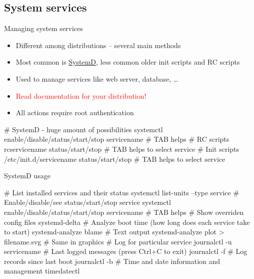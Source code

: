 \documentclass[compress, ucs, xelatex, 11pt, xcolor=svgnames,
  hyperref={
    bookmarks=true,
    unicode=true,
    colorlinks=true,
    pdftitle={Linux, command line and MetaCentrum},
    plainpages=false,
    pdfauthor={Vojtech Zeisek},
    pdfsubject={Course about use of Linux command line, writing shell scripts and using MetaCentrum of CESNET},
    pdfcreator={XeLaTeX},
    pdfkeywords={Linux, GNU, BASH, shell, command line, MetaCentrum},
    linkcolor=Red,
    anchorcolor=Blue,
    citecolor=Purple,
    filecolor=DodgerBlue,
    menucolor=DarkOrchid,
    urlcolor=DeepSkyBlue,
    pdftex},
  url={hyphens, lowtilde} %
  ]{beamer}
\renewcommand{\alert}[1]{\textcolor{red}{#1}}
\begin{document}

\subsection{System services}

\begin{frame}[fragile]{Managing system services}
\begin{itemize}
  \item Different among distributions -- several main methods
  \item Most common is \href{https://wiki.freedesktop.org/www/Software/systemd/}{SystemD}, less common older init scripts and RC scripts
  \item Used to manage services like web server, database, \ldots
  \item \alert{Read documentation for your distribution!}
  \item All actions require root authentication
\end{itemize}
  \begin{bashcode}
    # SystemD - huge amount of possibilities
    systemctl enable/disable/status/start/stop servicename # TAB helps
    # RC scripts
    rcservicename status/start/stop # TAB helps to select service
    # Init scripts
    /etc/init.d/servicename status/start/stop # TAB helps to select service
  \end{bashcode}
\end{frame}

\begin{frame}[fragile]{SystemD usage}
  \begin{bashcode}
    # List installed services and their status
    systemctl list-units --type service
    # Enable/disable/see status/start/stop service
    systemctl enable/disable/status/start/stop servicename # TAB helps
    # Show overriden config files
    systemd-delta
    # Analyze boot time (how long does each service take to start)
    systemd-analyze blame # Text output
    systemd-analyze plot > filename.svg # Same in graphics
    # Log for particular service
    journalctl -u servicename
    # Last logged messages (press Ctrl+C to exit)
    journalctl -f
    # Log records since last boot
    journalctl -b
    # Time and date information and management
    timedatectl
  \end{bashcode}
\end{frame}
\end{document}
